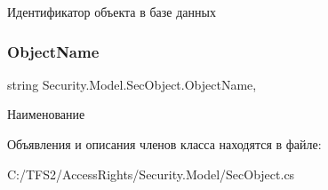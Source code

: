 Идентификатор объекта в базе данных 

\mbox{\label{class_security_1_1_model_1_1_sec_object_a108abf3c2957c7806401ff2702d47365}} 
\subsubsection{\texorpdfstring{Object\+Name}{ObjectName}}
{\footnotesize\ttfamily string Security.\+Model.\+Sec\+Object.\+Object\+Name\hspace{0.3cm}{\ttfamily [get]}, {\ttfamily [set]}}



Наименование 



Объявления и описания членов класса находятся в файле\+:\begin{DoxyCompactItemize}
\item 
C\+:/\+T\+F\+S2/\+Access\+Rights/\+Security.\+Model/Sec\+Object.\+cs\end{DoxyCompactItemize}
